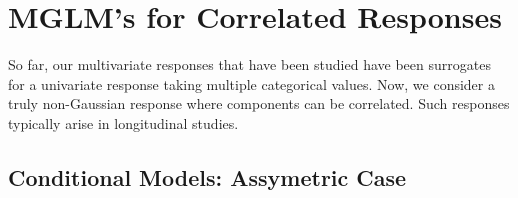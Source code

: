 
\section{MGLM's for Correlated Responses}

So far, our multivariate responses that have been studied have been surrogates for a univariate response taking multiple categorical values. Now, we consider a truly non-Gaussian response where components can be correlated. Such responses typically arise in longitudinal studies. 

\subsection{Conditional Models: Assymetric Case}


